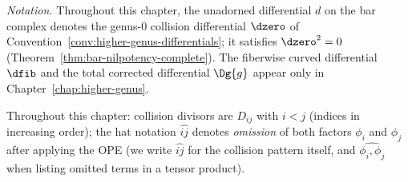 \smallskip
\noindent\textit{Notation.}
Throughout this chapter, the unadorned differential $d$ on the bar complex denotes the genus-$0$ collision differential $\dzero$ of Convention~\ref{conv:higher-genus-differentials}; it satisfies $\dzero^2 = 0$ (Theorem~\ref{thm:bar-nilpotency-complete}).  The fiberwise curved differential $\dfib$ and the total corrected differential $\Dg{g}$ appear only in Chapter~\ref{chap:higher-genus}.

\medskip

\begin{convention}\label{conv:set-notation}
Throughout this chapter: collision divisors are $D_{ij}$ with $i < j$ (indices in increasing order); the hat notation $\widehat{ij}$ denotes \emph{omission} of both factors $\phi_i$ and $\phi_j$ after applying the OPE (we write $\widehat{ij}$ for the collision pattern itself, and $\widehat{\phi_i, \phi_j}$ when listing omitted terms in a tensor product).
\end{convention}

